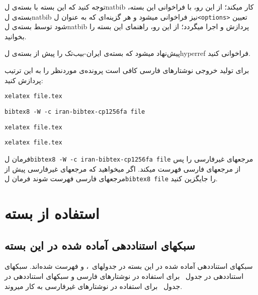 \documentclass[a4paper,11pt]{article}
\begin{document}
توجه کنید که این بسته با بسته‌ی \م‌ل{\sffamily natbib} کار میکند؛ از این رو، با فراخوانی این بسته، بسته‌ی \م‌ل{\sffamily natbib} نیز فراخوانی میشود و هر گزینه‌ای که به عنوان \م‌ل{\tt <options>} تعیین شود توسط بسته‌ی \م‌ل{\sffamily natbib} پردازش و اجرا میگردد؛ از این رو، راهنمای این بسته را بخوانید.


پیش‌نهاد میشود که بسته‌ی ایران-بیب‌تک را پیش از بسته‌ی \م‌ل{\sffamily hyperref} فراخوانی کنید.


برای تولید خروجی نوشتارهای فارسی کافی است پرونده‌ی موردنظر را به این ترتیب پردازش کنید:
\begin{itemize}[noitemsep, topsep=0pt]
\begin{latinitems}
\item \texttt{xelatex file.tex}
\item \texttt{bibtex8 -W -c iran-bibtex-cp1256fa file}
\item \texttt{xelatex file.tex}
\item \texttt{xelatex file.tex}
\end{latinitems}
\end{itemize}


فرمان \م‌ل{\tt bibtex8 -W -c iran-bibtex-cp1256fa file} مرجعهای غیرفارسی را پس از مرجعهای فارسی فهرست میکند. اگر میخواهید که مرجعهای غیرفارسی پیش از مرجعهای فارسی فهرست شوند فرمان \م‌ل{\tt bibtex8 file} را جایگزین کنید.




\section{استفاده از بسته}


\subsection{سبکهای استناددهی آماده شده در این بسته}

سبکهای استناددهی آماده شده در این بسته در جدولهای~، و  فهرست شده‌اند. سبکهای استناددهی در جدول~ برای استفاده در نوشتارهای فارسی و سبکهای استناددهی در جدول~ برای استفاده در نوشتارهای غیرفارسی به کار میروند.
\end{document}
